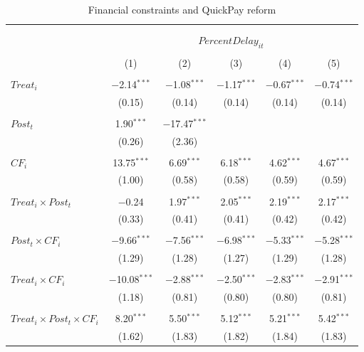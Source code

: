 \documentclass[
]{article}
\begin{document}
\begin{table}[H] \centering 
  \caption{Financial constraints and QuickPay reform} 
  \label{} 
\small 
\begin{tabular}{@{\extracolsep{-2pt}}lccccc} 
\\[-1.8ex]\hline 
\hline \\[-1.8ex] 
\\[-1.8ex] & \multicolumn{5}{c}{$PercentDelay_{it}$  } \\ 
\\[-1.8ex] & (1) & (2) & (3) & (4) & (5)\\ 
\hline \\[-1.8ex] 
 $Treat_i$ & $-$2.14$^{***}$ & $-$1.08$^{***}$ & $-$1.17$^{***}$ & $-$0.67$^{***}$ & $-$0.74$^{***}$ \\ 
  & (0.15) & (0.14) & (0.14) & (0.14) & (0.14) \\ 
  & & & & & \\ 
 $Post_t$ & 1.90$^{***}$ & $-$17.47$^{***}$ &  &  &  \\ 
  & (0.26) & (2.36) &  &  &  \\ 
  & & & & & \\ 
 $CF_i$ & 13.75$^{***}$ & 6.69$^{***}$ & 6.18$^{***}$ & 4.62$^{***}$ & 4.67$^{***}$ \\ 
  & (1.00) & (0.58) & (0.58) & (0.59) & (0.59) \\ 
  & & & & & \\ 
 $Treat_i \times Post_t$ & $-$0.24 & 1.97$^{***}$ & 2.05$^{***}$ & 2.19$^{***}$ & 2.17$^{***}$ \\ 
  & (0.33) & (0.41) & (0.41) & (0.42) & (0.42) \\ 
  & & & & & \\ 
 $Post_t \times CF_i$ & $-$9.66$^{***}$ & $-$7.56$^{***}$ & $-$6.98$^{***}$ & $-$5.33$^{***}$ & $-$5.28$^{***}$ \\ 
  & (1.29) & (1.28) & (1.27) & (1.29) & (1.28) \\ 
  & & & & & \\ 
 $Treat_i \times CF_i$ & $-$10.08$^{***}$ & $-$2.88$^{***}$ & $-$2.50$^{***}$ & $-$2.83$^{***}$ & $-$2.91$^{***}$ \\ 
  & (1.18) & (0.81) & (0.80) & (0.80) & (0.81) \\ 
  & & & & & \\ 
 $Treat_i \times Post_t \times CF_i$ & 8.20$^{***}$ & 5.50$^{***}$ & 5.12$^{***}$ & 5.21$^{***}$ & 5.42$^{***}$ \\ 
  & (1.62) & (1.83) & (1.82) & (1.84) & (1.83) \\ 

\end{tabular}
\end{table}
\end{document}
